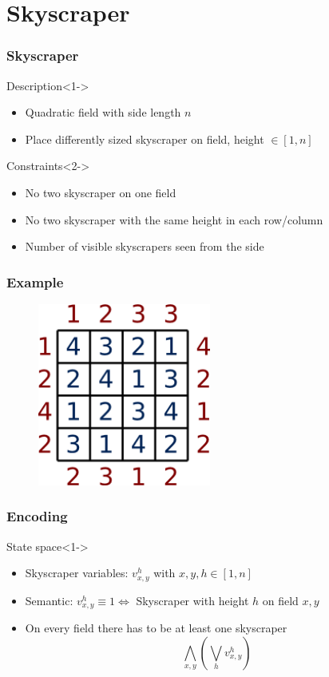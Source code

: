 \section{Skyscraper}

\begin{frame}
	\frametitle{Skyscraper}
	\begin{block}{Description}<1->
		\begin{itemize}
			\item Quadratic field with side length $n$
			\item Place differently sized skyscraper on field, height $\in[1,n]$
		\end{itemize}
	\end{block}
	\begin{block}{Constraints}<2->
		\begin{itemize}
			\item No two skyscraper on one field
			\item No two skyscraper with the same height in each row/column
			\item Number of visible skyscrapers seen from the side
		\end{itemize}
	\end{block}
\end{frame}

\begin{frame}
	\frametitle{Example}
	\begin{figure}
		\centering
		\includegraphics[height=6cm]{images/skyscraper.png}
	\end{figure}
\end{frame}

\begin{frame}
	\frametitle{Encoding}
	\begin{block}{State space}<1->
		\begin{itemize}
			\item Skyscraper variables: $v_{x,y}^{h}$ with $x,y,h\in[1,n]$
			\item Semantic: $v_{x,y}^{h} \equiv 1 \Leftrightarrow$ Skyscraper with height $h$ on field $x,y$
		\end{itemize}
	\end{block}
	\begin{itemize}
		\item<2-> On every field there has to be at least one skyscraper
		\begin{displaymath}
			\bigwedge_{x,y} \left( \bigvee_{h} v_{x,y}^h\right)
		\end{displaymath}
	\end{itemize}
\end{frame}

